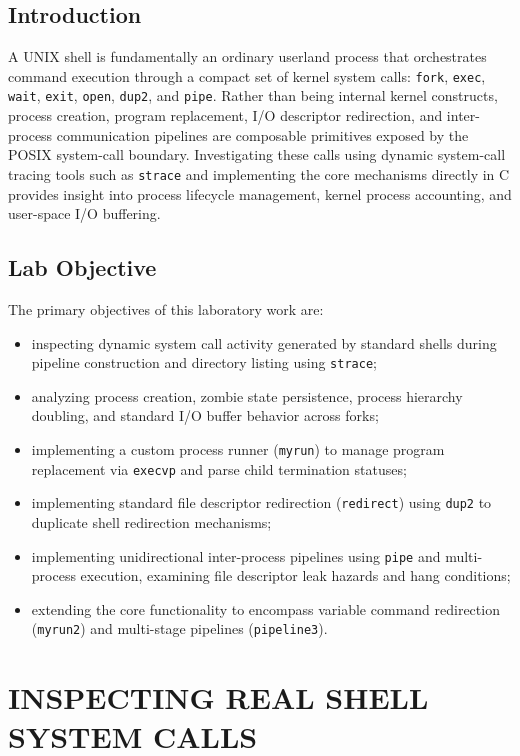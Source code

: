 \documentclass[12pt,a4paper]{report}
\numberwithin{equation}{chapter}
\numberwithin{figure}{chapter}
\numberwithin{table}{chapter}
\begin{document}
\section{Introduction}
A UNIX shell is fundamentally an ordinary userland process that orchestrates command execution through a compact set of kernel system calls: \texttt{fork}, \texttt{exec}, \texttt{wait}, \texttt{exit}, \texttt{open}, \texttt{dup2}, and \texttt{pipe}. Rather than being internal kernel constructs, process creation, program replacement, I/O descriptor redirection, and inter-process communication pipelines are composable primitives exposed by the POSIX system-call boundary. Investigating these calls using dynamic system-call tracing tools such as \texttt{strace} and implementing the core mechanisms directly in C provides insight into process lifecycle management, kernel process accounting, and user-space I/O buffering.

\section{Lab Objective}
The primary objectives of this laboratory work are:
\begin{itemize}
    \item inspecting dynamic system call activity generated by standard shells during pipeline construction and directory listing using \texttt{strace};
    \item analyzing process creation, zombie state persistence, process hierarchy doubling, and standard I/O buffer behavior across forks;
    \item implementing a custom process runner (\texttt{myrun}) to manage program replacement via \texttt{execvp} and parse child termination statuses;
    \item implementing standard file descriptor redirection (\texttt{redirect}) using \texttt{dup2} to duplicate shell redirection mechanisms;
    \item implementing unidirectional inter-process pipelines using \texttt{pipe} and multi-process execution, examining file descriptor leak hazards and hang conditions;
    \item extending the core functionality to encompass variable command redirection (\texttt{myrun2}) and multi-stage pipelines (\texttt{pipeline3}).
\end{itemize}

\chapter{INSPECTING REAL SHELL SYSTEM CALLS}
\end{document}
